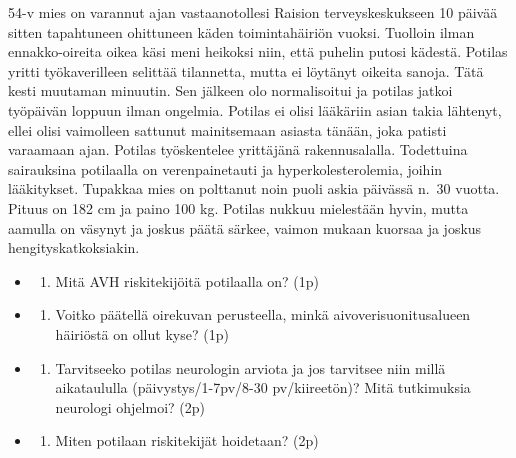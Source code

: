 \documentclass[
]{book}
\providecommand{\tightlist}{%
  \setlength{\itemsep}{0pt}\setlength{\parskip}{0pt}}
\begin{document}
54-v mies on varannut ajan vastaanotollesi Raision terveyskeskukseen 10 päivää sitten tapahtuneen ohittuneen käden toimintahäiriön vuoksi. Tuolloin ilman ennakko-oireita oikea käsi meni heikoksi niin, että puhelin putosi kädestä. Potilas yritti työkaverilleen selittää tilannetta, mutta ei löytänyt oikeita sanoja. Tätä kesti muutaman minuutin. Sen jälkeen olo normalisoitui ja potilas jatkoi työpäivän loppuun ilman ongelmia. Potilas ei olisi lääkäriin asian takia lähtenyt, ellei olisi vaimolleen sattunut mainitsemaan asiasta tänään, joka patisti varaamaan ajan. Potilas työskentelee yrittäjänä rakennusalalla. Todettuina sairauksina potilaalla on verenpainetauti ja hyperkolesterolemia, joihin lääkitykset. Tupakkaa mies on polttanut noin puoli askia päivässä n.~30 vuotta. Pituus on 182 cm ja paino 100 kg. Potilas nukkuu mielestään hyvin, mutta aamulla on väsynyt ja joskus päätä särkee, vaimon mukaan kuorsaa ja joskus hengityskatkoksiakin.

\begin{itemize}
\tightlist
\item
  \begin{enumerate}
  \def\labelenumi{\alph{enumi}.}
  \tightlist
  \item
    Mitä AVH riskitekijöitä potilaalla on? (1p)
  \end{enumerate}
\item
  \begin{enumerate}
  \def\labelenumi{\alph{enumi}.}
  \setcounter{enumi}{1}
  \tightlist
  \item
    Voitko päätellä oirekuvan perusteella, minkä aivoverisuonitusalueen häiriöstä on ollut kyse? (1p)
  \end{enumerate}
\item
  \begin{enumerate}
  \def\labelenumi{\alph{enumi}.}
  \setcounter{enumi}{2}
  \tightlist
  \item
    Tarvitseeko potilas neurologin arviota ja jos tarvitsee niin millä aikataululla (päivystys/1-7pv/8-30 pv/kiireetön)? Mitä tutkimuksia neurologi ohjelmoi? (2p)
  \end{enumerate}
\item
  \begin{enumerate}
  \def\labelenumi{\alph{enumi}.}
  \setcounter{enumi}{3}
  \tightlist
  \item
    Miten potilaan riskitekijät hoidetaan? (2p)
  \end{enumerate}
\end{itemize}
\end{document}
